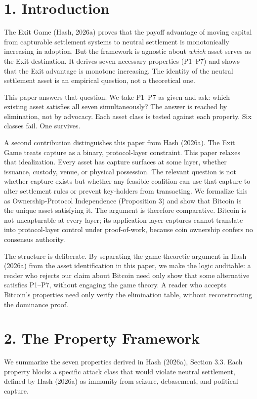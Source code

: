 \documentclass[12pt]{article}
\theoremstyle{definition}
\theoremstyle{remark}
\begin{document}
\section{1. Introduction}

The Exit Game (Hash, 2026a) proves that the payoff advantage of moving
capital from capturable settlement systems to neutral settlement is
monotonically increasing in adoption. But the framework is agnostic
about \emph{which} asset serves as the Exit destination. It derives
seven necessary properties (P1--P7) and shows that the Exit advantage is
monotone increasing. The identity of the neutral settlement asset is an
empirical question, not a theoretical one.

This paper answers that question. We take P1--P7 as given and ask: which
existing asset satisfies all seven simultaneously? The answer is reached
by elimination, not by advocacy. Each asset class is tested against each
property. Six classes fail. One survives.

A second contribution distinguishes this paper from Hash (2026a). The
Exit Game treats capture as a binary, protocol-layer constraint. This
paper relaxes that idealization. Every asset has capture surfaces at
some layer, whether issuance, custody, venue, or physical possession.
The relevant question is not whether capture exists but whether any
feasible coalition can use that capture to alter settlement rules or
prevent key-holders from transacting. We formalize this as
Ownership-Protocol Independence (Proposition 3) and show that Bitcoin
is the unique asset satisfying it. The argument is therefore
comparative. Bitcoin is not uncapturable at every layer; its
application-layer captures cannot translate into protocol-layer control
under proof-of-work, because coin ownership confers no consensus
authority.

The structure is deliberate. By separating the game-theoretic argument
in Hash (2026a) from the asset identification in this paper, we make the
logic auditable: a reader who rejects our claim about Bitcoin need only
show that some alternative satisfies P1--P7, without engaging the game
theory. A reader who accepts Bitcoin's properties need only verify the
elimination table, without reconstructing the dominance proof.
\section{2. The Property Framework}

We summarize the seven properties derived in Hash (2026a), Section 3.3.
Each property blocks a specific attack class that would violate neutral
settlement, defined by Hash (2026a) as immunity from seizure,
debasement, and political capture.
\end{document}

